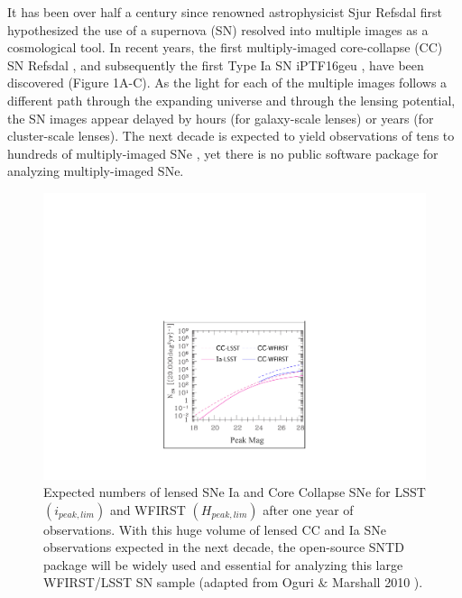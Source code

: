 It has been over half a century since renowned astrophysicist Sjur
Refsdal first hypothesized the use of a supernova (SN) resolved into
multiple images as a cosmological tool. In recent years, the first
multiply-imaged core-collapse (CC) SN Refsdal \citep{Kelly:2015a}, and
subsequently the first Type Ia SN iPTF16geu \citep{Goobar:2016}, have
been discovered (Figure 1A-C). As the light for each of the multiple
images follows a different path through the expanding universe and
through the lensing potential, the SN images appear delayed by hours
(for galaxy-scale lenses) or years (for cluster-scale lenses). The
next decade is expected to yield observations of tens to hundreds of
multiply-imaged SNe \citep{Oguri:2010a}, yet there is no public
software package for analyzing multiply-imaged SNe.

\begin{figure}
\centering
\includegraphics[height=.4\textwidth]{FIG/wfirst_lsst}
\caption{
\noindent\fontsize{10}{14}\selectfont
Expected numbers of lensed SNe Ia and Core Collapse SNe for LSST
$(i_{peak,lim})$ and WFIRST $(H_{peak,lim})$ after one year of
observations. With this huge volume of lensed CC and Ia SNe
observations expected in the next decade, the open-source SNTD package
will be widely used and essential for analyzing this large WFIRST/LSST SN sample
(adapted from Oguri $\&$ Marshall 2010 \cite{Oguri:2010a}).}
\end{figure}

